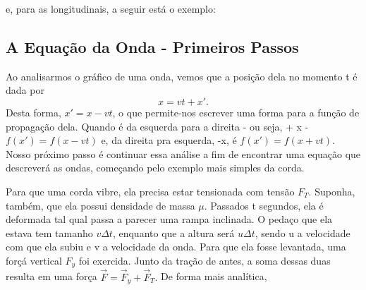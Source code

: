 \documentclass{article}
\begin{document}
\begin{center}
\end{center}

e, para as longitudinais, a seguir está o exemplo:

\begin{center}
\end{center}

\subsection{A Equação da Onda - Primeiros Passos}
Ao analisarmos o gráfico de uma onda, vemos que a posição dela no momento t é dada por 
\[
  x = vt + x'.
\]
Desta forma, \(x' = x - vt\), o que permite-nos escrever uma forma para a função de propagação dela. Quando
é da esquerda para a direita - ou seja, + x - \(f(x') = f(x-vt)\) e, da direita pra esquerda, -x, é \(f(x') = f(x+vt)\).
Nosso próximo passo é continuar essa análise a fim de encontrar uma equação que descreverá as ondas, começando pelo exemplo
mais simples da corda.

Para que uma corda vibre, ela precisa estar tensionada com tensão \(F_{T}\). Suponha, também, que ela possui densidade de massa \(\mu\).
Passados t segundos, ela é deformada tal qual passa a parecer uma rampa inclinada. O pedaço que ela estava tem tamanho
\(v\Delta t\), enquanto que a altura será \(u\Delta t\), sendo u a velocidade com que ela subiu e v a velocidade da onda.
Para que ela fosse levantada, uma forçá vertical \(F_{y}\) foi exercida. Junto da tração de antes, a soma dessas duas resulta em uma
força \(\vec{F} = \vec{F}_{y} + \vec{F}_{T}.\) De forma mais analítica,
\end{document}
